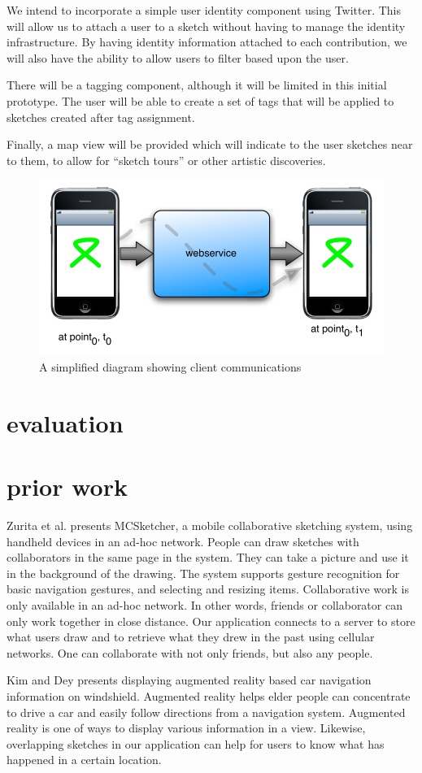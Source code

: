 \documentclass{chi2009}
\begin{document}
We intend to incorporate a simple user identity component using Twitter.  This
will allow us to attach a user to a sketch without having to manage the
identity infrastructure.  By having identity information attached to each
contribution, we will also have the ability to allow users to filter based upon
the user.

There will be a tagging component, although it will be limited in this initial
prototype.  The user will be able to create a set of tags that will be applied
to sketches created after tag assignment.

Finally, a map view will be provided which will indicate to the user sketches
near to them, to allow for ``sketch tours'' or other artistic discoveries.

\begin{figure}
\centering
\includegraphics[width=.45\textwidth]{arch.pdf}
\caption{A simplified diagram showing client communications}
\label{fig:arch}
\end{figure}

\section{evaluation}

\section{prior work}
Zurita et al. \cite{sketching:zurita} presents MCSketcher, a mobile
collaborative sketching system, using handheld devices in an ad-hoc network.
People can draw sketches with collaborators in the same page in the system.
They can take a picture and use it in the background of the drawing. The system
supports gesture recognition for basic navigation gestures, and selecting and
resizing items. Collaborative work is only available in an ad-hoc network. In
other words, friends or collaborator can only work together in close distance.
Our application connects to a server to store what users draw and to retrieve
what they drew in the past using cellular networks. One can collaborate with
not only friends, but also any people.

Kim and Dey \cite{augmented_reality:kim} presents displaying augmented reality
based car navigation information on windshield. Augmented reality helps elder
people can concentrate to drive a car and easily follow directions from a
navigation system. Augmented reality is one of ways to display various
information in a view. Likewise, overlapping sketches in our application can help for users to
know what has happened in a certain location.
\end{document}
